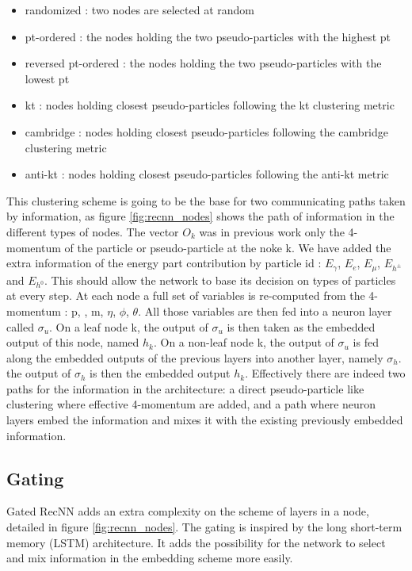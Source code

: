 \begin{itemize}
    \item randomized : two nodes are selected at random
    \item pt-ordered : the nodes holding the two pseudo-particles with the highest pt 
    \item reversed pt-ordered : the nodes holding the two pseudo-particles with the lowest pt
    \item kt : nodes holding closest pseudo-particles following the kt clustering metric
    \item cambridge : nodes holding closest pseudo-particles following the cambridge clustering metric
    \item anti-kt : nodes holding closest pseudo-particles following the anti-kt metric
\end{itemize}

This clustering scheme is going to be the base for two communicating paths taken by information, as figure \ref{fig:recnn_nodes} shows the path of information in the different types of nodes.
The vector $O_k$ was in previous work only the 4-momentum of the particle or pseudo-particle at the noke k. We have added the extra information of the energy part contribution by particle id : $E_{\gamma}$, $E_{e}$, $E_{\mu}$, $E_{h^{\pm}}$ and $E_{h^{0}}$. This should allow the network to base its decision on types of particles at every step. 
At each node a full set of variables is re-computed from the 4-momentum : p, \pt, m, $\eta$, $\phi$, $\theta$. All those variables are then fed into a neuron layer called $\sigma_{u}$.
On a leaf node k, the output of $\sigma_{u}$ is then taken as the embedded output of this node, named $h_k$.
On a non-leaf node k, the output of $\sigma_{u}$ is fed along the embedded outputs of the previous layers into another layer, namely $\sigma_h$. the output of $\sigma_h$ is then the embedded output $h_k$.
Effectively there are indeed two paths for the information in the architecture: a direct pseudo-particle like clustering where effective 4-momentum are added, and a path where neuron layers embed the information and mixes it with the existing previously embedded information.

\subsection{Gating}

Gated RecNN adds an extra complexity on the scheme of layers in a node, detailed in figure \ref{fig:recnn_nodes}. The gating is inspired by the long short-term memory (LSTM) architecture. It adds the possibility for the network to select and mix information in the embedding scheme more easily. 

